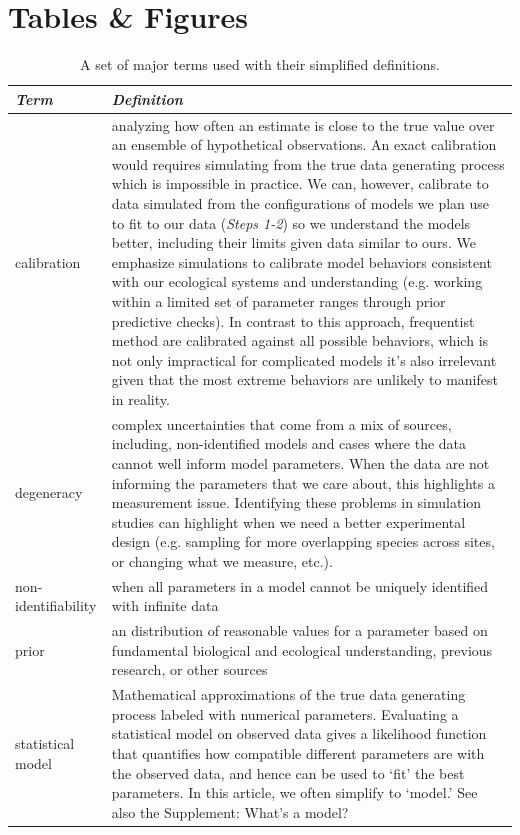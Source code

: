 \documentclass[11pt]{article}
\begin{document}
\clearpage

\section*{Tables \& Figures}


\begin{table}
\caption{A set of major terms used with their simplified definitions.}
\begin{tabular}{ p{3 cm}  p{13 cm} }  \hline \hline
 \emph{Term}   & \emph{Definition}\\ 
\hline \hline
calibration & analyzing how often an estimate is close to the true value over an ensemble of hypothetical observations.  An exact calibration would requires simulating from the true data generating process which is impossible in practice.  We can, however, calibrate to data simulated from the configurations of models we plan use to fit to our data (\emph{Steps 1-2}) so we understand the models better, including their limits given data similar to ours. We emphasize simulations to calibrate model behaviors consistent with our ecological systems and understanding (e.g. working within a limited set of parameter ranges through prior predictive checks). In contrast to this approach, frequentist method are calibrated against all possible behaviors, which is not only impractical for complicated models it’s also irrelevant given that the most extreme behaviors are unlikely to manifest in reality. \\\hline
degeneracy & complex uncertainties that come from a mix of sources, including, non-identified models and cases where the data cannot well inform model parameters. When the data are not informing the parameters that we care about, this highlights a measurement issue. Identifying these problems in simulation studies can highlight when we need a better experimental design (e.g. sampling for more overlapping species across sites, or changing what we measure, etc.).  \\\hline
non-identifiability & when all parameters in a model cannot be uniquely identified with infinite data \\\hline
prior & an distribution of reasonable values for a parameter based on fundamental biological and ecological understanding, previous research, or other sources \\\hline
statistical model & Mathematical approximations of the true data generating process labeled with numerical parameters.  Evaluating a statistical model on observed data gives a likelihood function that quantifies how compatible different parameters are with the observed data, and hence can be used to `fit' the best parameters. In this article, we often simplify to `model.' See also the Supplement: What's a model? \\\hline

\end{tabular}
\end{table}
\end{document}
